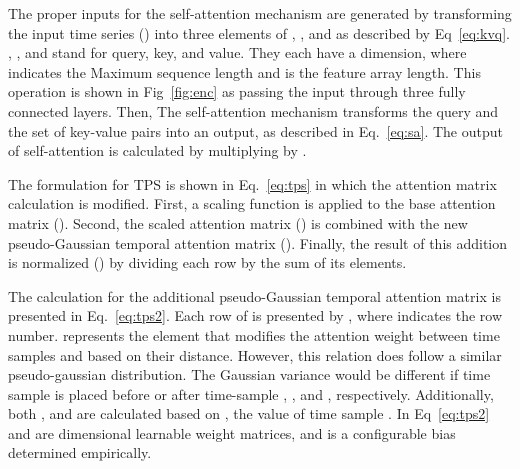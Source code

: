 \documentclass[journal]{IEEEtran}
\begin{document}
The proper inputs for the self-attention mechanism are generated by transforming the input time series () into three elements of , , and  as described by Eq~\eqref{eq:kvq}. , , and  stand for query, key, and value. They each have a  dimension, where  indicates the Maximum sequence length and  is the feature array length. This operation is shown in Fig~\ref{fig:enc} as passing the input through three fully connected layers. Then, The self-attention mechanism transforms the query and the set of key-value pairs into an output, as described in Eq.~\eqref{eq:sa}. The output of self-attention  is calculated by multiplying  by .





The formulation for TPS is shown in Eq.~\eqref{eq:tps} in which the attention matrix calculation is modified. First, a scaling function is applied to the base attention matrix (). Second, the scaled attention matrix () is combined with the new pseudo-Gaussian temporal attention matrix (). Finally, the result of this addition is normalized () by dividing each row by the sum of its elements.


The calculation for the additional pseudo-Gaussian temporal attention matrix  is presented in Eq.~\eqref{eq:tps2}. Each row of  is presented by , where  indicates the row number.  represents the element that modifies the attention weight between time samples  and  based on their distance. However, this relation does follow a similar pseudo-gaussian distribution. The Gaussian variance would be different if time sample  is placed before or after time-sample , , and , respectively. Additionally, both , and  are calculated based on , the value of time sample . In Eq~\eqref{eq:tps2}  and  are  dimensional learnable weight matrices, and  is a configurable bias determined empirically. 
\end{document}
